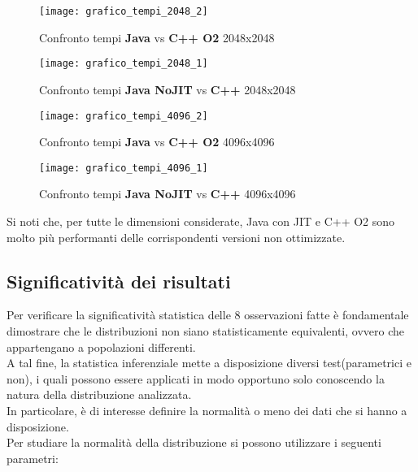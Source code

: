 \clearpage

\begin{figure}[!htbp]
  \texttt{[image: grafico\_tempi\_2048\_2]}
  \caption{Confronto tempi \textbf{Java} vs \textbf{C++ O2} 2048x2048}
  \label{grafico_tempi_2048_2}
\end{figure}

\begin{figure}[!htbp]
  \texttt{[image: grafico\_tempi\_2048\_1]}
  \caption{Confronto tempi \textbf{Java NoJIT} vs \textbf{C++} 2048x2048}
  \label{grafico_tempi_2048_1}
\end{figure}

\clearpage

\begin{figure}[!htbp]
  \texttt{[image: grafico\_tempi\_4096\_2]}
  \caption{Confronto tempi \textbf{Java} vs \textbf{C++ O2} 4096x4096}
  \label{grafico_tempi_4096_2}
\end{figure}

\begin{figure}[!htbp]
  \texttt{[image: grafico\_tempi\_4096\_1]}
  \caption{Confronto tempi \textbf{Java NoJIT} vs \textbf{C++} 4096x4096}
  \label{grafico_tempi_4096_1}
\end{figure}

Si noti che, per tutte le dimensioni considerate, Java con JIT e C++ O2 sono
molto più performanti delle corrispondenti versioni non ottimizzate.\\
\clearpage
\subsection{Significatività dei risultati}

Per verificare la significatività statistica delle 8 osservazioni fatte è fondamentale
dimostrare che le distribuzioni non siano statisticamente equivalenti, ovvero che
appartengano a popolazioni differenti.\\
A tal fine, la statistica inferenziale mette a disposizione diversi test(parametrici e non),
i quali possono essere applicati in modo opportuno solo conoscendo la natura
della distribuzione analizzata.\\
In particolare, è di interesse definire la normalità o meno dei dati che si hanno
a disposizione.\\
Per studiare la normalità della distribuzione si possono utilizzare i seguenti
parametri:


